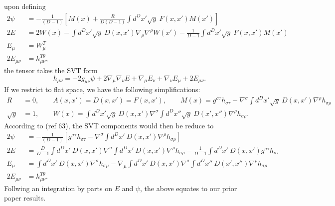 \documentclass[10pt,letterpaper]{article}
\begin{document}
upon defining
\begin{align}
2\psi &= -\frac{1}{(D-1)}\left[ M(x) + \frac{R}{D(D-1)} \int   d^Dx' \sqrt{g}\ F(x,x') M(x') \right]
\nonumber\\
2E&= 2W(x)- \int d^Dx' \sqrt{g}\ D(x,x')\nabla_\rho \nabla^\rho W(x') - \frac{1}{D-1} \int  d^Dx' \sqrt{g}\ F(x,x') M(x')
\nonumber\\
E_{\mu}&= W_{\mu}^T
\nonumber\\
2E_{\mu\nu} &= h_{\mu\nu}^{T\theta},
\end{align}
the tensor takes the SVT form
\begin{equation}
h_{\mu\nu} = -2 g_{\mu\nu}\psi + 2\nabla_\mu \nabla_\nu E + \nabla_\mu E_\nu +\nabla_\nu E_\mu + 2E_{\mu\nu}.
\end{equation}
If we restrict to flat space, we have the following simplifications:
\begin{align}
R &= 0,\qquad A(x,x') = D(x,x') = F(x,x'),\qquad M(x) =  g^{\sigma\tau}h_{\sigma\tau} - \nabla^\sigma \int d^Dx' \sqrt{g}\ D(x,x') \nabla^\rho h_{\sigma\rho}
\nonumber\\
\sqrt g &= 1,\qquad W(x) = \int d^Dx' \sqrt{g}\ D(x,x') \nabla^\sigma  \int   d^Dx'' \sqrt{g}\ D(x',x'') \nabla^\rho h_{\sigma\rho}.
\end{align}
According to (ref 63), the SVT components would then be reduce to
\begin{align}
2\psi &= -\frac{1}{(D-1)}\left[  g^{\sigma\tau}h_{\sigma\tau} - \nabla^\sigma \int d^Dx' \ D(x,x') \nabla^\rho h_{\sigma\rho} \right]
\nonumber\\
2E&= \frac{D}{D-1} \int d^Dx'\ D(x,x') \nabla^\sigma  \int   d^Dx' \ D(x,x') \nabla^\rho h_{\sigma\rho}
 - \frac{1}{D-1} \int  d^Dx' \ D(x,x') g^{\sigma\tau}h_{\sigma\tau}
\nonumber\\
E_{\mu}&=  \int d^Dx' \ D(x,x')\nabla^\sigma h_{\sigma\mu} - \nabla_\mu \int d^Dx' \ D(x,x')
\nabla^\sigma \int d^Dx'' \ D(x',x'') \nabla^\rho h_{\sigma\rho}
\nonumber\\
2E_{\mu\nu} &= h_{\mu\nu}^{T\theta}.
\end{align}
Follwing an integration by parts on $E$ and $\psi$, the above equates to our prior paper results. 
\end{document}
